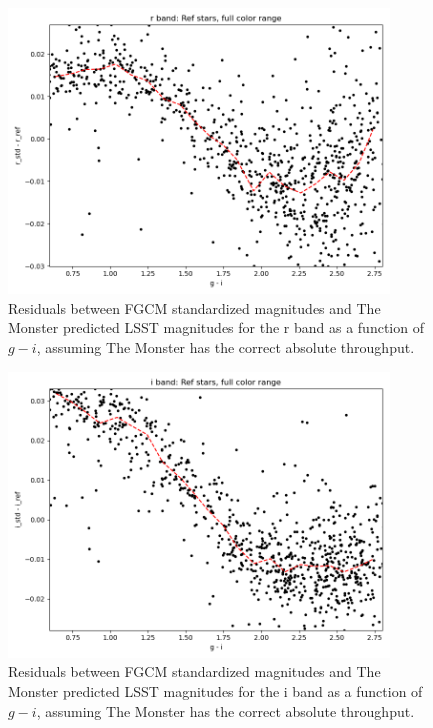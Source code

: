 \begin{figure}
  \begin{center}
    \includegraphics[width=0.9\textwidth]{photometric_calibration_figures/reference_residuals_r.png}
  \end{center}
  \caption{Residuals between FGCM standardized magnitudes and The Monster
    predicted LSST magnitudes for the r band as a function of $g-i$, assuming
    The Monster has the correct absolute throughput.}
\end{figure}

\begin{figure}
  \begin{center}
    \includegraphics[width=0.9\textwidth]{photometric_calibration_figures/reference_residuals_i.png}
  \end{center}
  \caption{Residuals between FGCM standardized magnitudes and The Monster
    predicted LSST magnitudes for the i band as a function of $g-i$, assuming
    The Monster has the correct absolute throughput.}
\end{figure}

